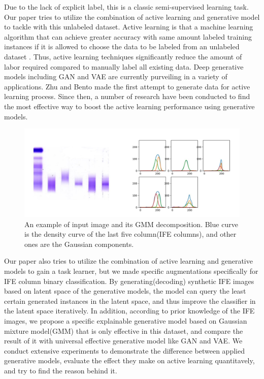 \documentclass[10pt,twocolumn,letterpaper]{article}
\begin{document}
Due to the lack of explicit label, this is a classic semi-supervised learning task. Our paper tries to utilize the combination of active learning and generative model to tackle with this unlabeled dataset. Active learning is that a machine learning algorithm that can achieve greater accuracy with same amount labeled training instances if it is allowed to choose the data to be labeled from an unlabeled dataset \cite{settles2009active}. Thus, active learning techniques significantly reduce the amount of labor required compared to manually label all existing data. Deep generative models including GAN and VAE are currently purveiling in a variety of applications. Zhu and Bento made the first attempt\cite{Zhu2017GenerativeAA} to generate data for active learning process. Since then, a number of research have been conducted to find the most effective way to boost the active learning performance using generative models.

\begin{figure}
    \begin{center}
    \includegraphics[width=0.9\linewidth]{fig_1.jpg}
    \end{center}
       \caption{An example of input image and its GMM decomposition. Blue curve is the density curve of the last five column(IFE columns), and other ones are the Gaussian components.}
    \label{fig:short}
\end{figure}

Our paper also tries to utilize the combination of active learning and generative models to gain a task learner, but we made specific augmentations specifically for IFE column binary classification. By generating(decoding) synthetic IFE images based on latent space of the generative models, the model can query the least certain generated instances in the latent space, and thus improve the classifier in the latent space iteratively. In addition, according to prior knowledge of the IFE images, we propose a specific explainable generative model based on Gaussian mixture model(GMM) that is only effective in this dataset, and compare the result of it with universal effective generative model like GAN and VAE. We conduct extensive experiments to demonstrate the difference between applied generative models, evaluate the effect they make on active learning quantitavely, and try to find the reason behind it.
\end{document}
